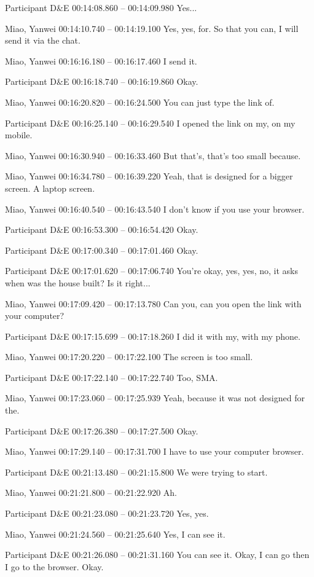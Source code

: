 {Participant D\&E 00:14:08.860 -- 00:14:09.980
Yes...

Miao, Yanwei 00:14:10.740 -- 00:14:19.100
Yes, yes, for. So that you can, I will send it via the chat.

Miao, Yanwei 00:16:16.180 -- 00:16:17.460
I send it.

Participant D\&E 00:16:18.740 -- 00:16:19.860
Okay.

Miao, Yanwei 00:16:20.820 -- 00:16:24.500
You can just type the link of.

Participant D\&E 00:16:25.140 -- 00:16:29.540
I opened the link on my, on my mobile.

Miao, Yanwei 00:16:30.940 -- 00:16:33.460
But that's, that's too small because.

Miao, Yanwei 00:16:34.780 -- 00:16:39.220
Yeah, that is designed for a bigger screen. A laptop screen.

Miao, Yanwei 00:16:40.540 -- 00:16:43.540
I don't know if you use your browser.

Participant D\&E 00:16:53.300 -- 00:16:54.420
Okay.

Participant D\&E 00:17:00.340 -- 00:17:01.460
Okay.

Participant D\&E 00:17:01.620 -- 00:17:06.740
You're okay, yes, yes, no, it asks when was the house built? Is it right...

Miao, Yanwei 00:17:09.420 -- 00:17:13.780
Can you, can you open the link with your computer?

Participant D\&E 00:17:15.699 -- 00:17:18.260
I did it with my, with my phone.

Miao, Yanwei 00:17:20.220 -- 00:17:22.100
The screen is too small.

Participant D\&E 00:17:22.140 -- 00:17:22.740
Too, SMA.

Miao, Yanwei 00:17:23.060 -- 00:17:25.939
Yeah, because it was not designed for the.

Participant D\&E 00:17:26.380 -- 00:17:27.500
Okay.

Miao, Yanwei 00:17:29.140 -- 00:17:31.700
I have to use your computer browser.

Participant D\&E 00:21:13.480 -- 00:21:15.800
We were trying to start.

Miao, Yanwei 00:21:21.800 -- 00:21:22.920
Ah.

Participant D\&E 00:21:23.080 -- 00:21:23.720
Yes, yes.

Miao, Yanwei 00:21:24.560 -- 00:21:25.640
Yes, I can see it.

Participant D\&E 00:21:26.080 -- 00:21:31.160
You can see it. Okay, I can go then I go to the browser. Okay.

}
